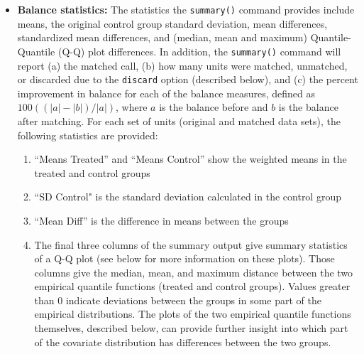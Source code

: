 \begin{itemize}
\item {\bf Balance statistics:} The statistics the \texttt{summary()}
  command provides include means, the original control group standard deviation, 
  mean differences, standardized mean
  differences, and (median, mean and maximum) Quantile-Quantile (Q-Q)
  plot differences.  In addition, the \texttt{summary()} command will
  report (a) the matched call, (b) how many units were matched,
  unmatched, or discarded due to the \texttt{discard} option
  (described below), and (c) the percent improvement in balance for
  each of the balance measures, defined as $100((|a|-|b|)/|a|)$, where
  $a$ is the balance before and $b$ is the balance after matching.
  For each set of units (original and matched data sets), the
  following statistics are provided:
\begin{enumerate}
  \item ``Means Treated'' and ``Means Control'' show the weighted
    means in the treated and control groups
  \item ``SD Control" is the standard deviation calculated in the control group
  \item ``Mean Diff'' is the difference in means between the groups
  \item The final three columns of the summary output give summary
    statistics of a Q-Q plot (see below for more information on these
    plots). Those columns give the median, mean, and maximum distance
    between the two empirical quantile functions (treated and control
    groups).  Values greater than 0 indicate deviations between the
    groups in some part of the empirical distributions.  The plots of
    the two empirical quantile functions themselves, described below,
    can provide further insight into which part of the covariate
    distribution has differences between the two groups.
\end{enumerate}


\end{itemize}
